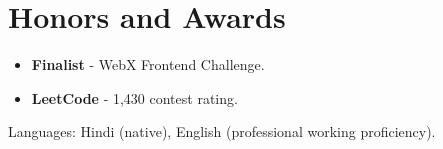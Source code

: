\documentclass[11pt,a4paper,sans]{moderncv}
\begin{document}

\section{Honors and Awards}
\vspace{1pt}
\begin{itemize}
    \item {\textbf{Finalist} - WebX Frontend Challenge.}
    \item {\textbf{LeetCode} - 1,430 contest rating.}
\end{itemize}


\vspace{2pt}
\small{Languages: Hindi (native), English (professional working proficiency).}
\end{document}
